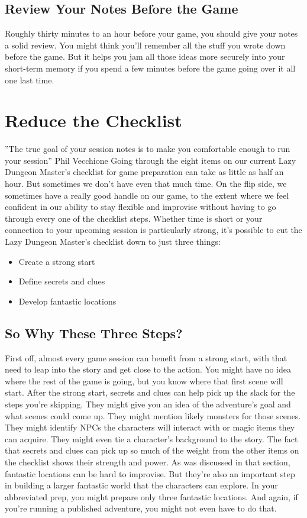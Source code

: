 \documentclass[10pt,a4paper,twoside,bg=print,twocolumn,openany,nodeprecatedcode]{dndbook}
\begin{document}
\subsection{Review Your Notes Before the Game}
Roughly thirty minutes to an hour before your game, you should give your notes a solid review. You might think you'll remember all the stuff you wrote down before the game. But it helps you jam all those ideas more securely into your short-term memory if you spend a few minutes before the game going over it all one last time.
\section{Reduce the Checklist}
\DndQuote%
{}
{''The true goal of your session notes is to make you comfortable enough to run your session''}
{Phil Vecchione}
Going through the eight items on our current Lazy Dungeon Master's checklist for game preparation can take as little as half an hour. But sometimes we don't have even that much time. On the flip side, we sometimes have a really good handle on our game, to the extent where we feel confident in our ability to stay flexible and improvise without having to go through every one of the checklist steps.
Whether time is short or your connection to your upcoming session is particularly strong, it's possible to cut the Lazy Dungeon Master's checklist down to just three things:

\begin{itemize}
\item Create a strong start
\item Define secrets and clues
\item Develop fantastic locations
\end{itemize}

\subsection{So Why These Three Steps?}
First off, almost every game session can benefit from a strong start, with that need to leap into the story and get close to the action. You might have no idea where the rest of the game is going, but you know where that first scene will start.
After the strong start, secrets and clues can help pick up the slack for the steps you're skipping. They might give you an idea of the adventure's goal and what scenes could come up. They might mention likely monsters for those scenes. They might identify NPCs the characters will interact with or magic items they can acquire. They might even tie a character's background to the story. The fact that secrets and clues can pick up so much of the weight from the other items on the checklist shows their strength and power.
As was discussed in that section, fantastic locations can be hard to improvise. But they're also an important step in building a larger fantastic world that the characters can explore. In your abbreviated prep, you might prepare only three fantastic locations. And again, if you're running a published adventure, you might not even have to do that.
\end{document}
